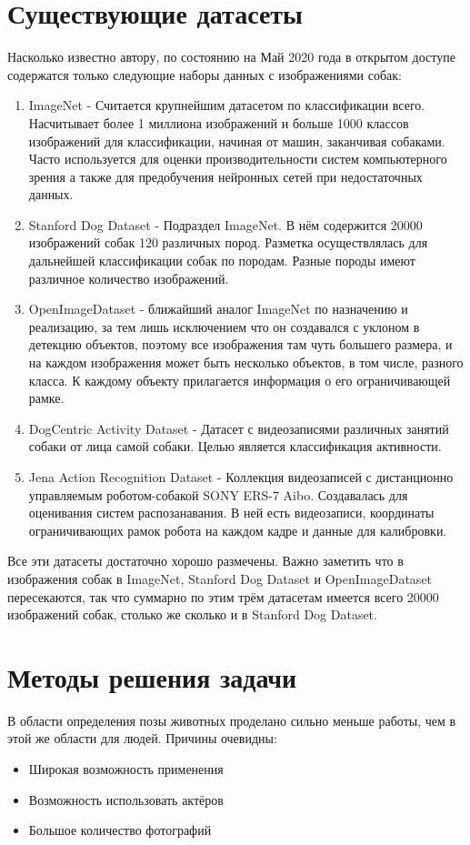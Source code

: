 \section{Существующие датасеты} \label{sect1_1}
Насколько известно автору, по состоянию на Май 2020 года в открытом доступе содержатся только следующие наборы данных с изображениями собак:
\begin{enumerate}
  \item ImageNet \cite{imagenet} - Считается крупнейшим датасетом по классификации всего. Насчитывает более 1 миллиона изображений и больше 1000 классов изображений для классификации, начиная от машин, заканчивая собаками. Часто используется для оценки производительности систем компьютерного зрения а также для предобучения нейронных сетей при недостаточных данных.
  \item Stanford Dog Dataset \cite{KhoslaYaoJayadevaprakashFeiFei_FGVC2011} - Подраздел ImageNet. В нём содержится 20000 изображений собак 120 различных пород. Разметка осуществлялась для дальнейшей классификации собак по породам. Разные породы имеют различное количество изображений.
  \item OpenImageDataset \cite{openimages} - ближайший аналог ImageNet по назначению и реализацию, за тем лишь исключением что он создавался с уклоном в детекцию объектов, поэтому все изображения там чуть большего размера, и на каждом изображения может быть несколько объектов, в том числе, разного класса. К каждому объекту прилагается информация о его ограничивающей рамке.
  \item DogCentric Activity Dataset \cite{yumi2014first} - Датасет с видеозаписями различных занятий собаки от лица самой собаки. Целью является классификация активности.
  \item Jena Action Recognition Dataset \cite{jena} - Коллекция видеозаписей с дистанционно управляемым роботом-собакой SONY ERS-7 Aibo. Создавалась для оценивания систем распозанавания. В ней есть видеозаписи, координаты ограничивающих рамок робота на каждом кадре и данные для калибровки.
\end{enumerate}
Все эти датасеты достаточно хорошо размечены. Важно заметить что в изображения собак в ImageNet, Stanford Dog Dataset и OpenImageDataset пересекаются, так что суммарно по этим трём датасетам имеется всего 20000 изображений собак, столько же сколько и в Stanford Dog Dataset.

\section{Методы решения задачи} \label{sect1_2}
В области определения позы животных проделано сильно меньше работы, чем в этой же области для людей. Причины очевидны:
\begin{itemize}
    \item Широкая возможность применения
    \item Возможность использовать актёров
    \item Большое количество фотографий
\end{itemize}
